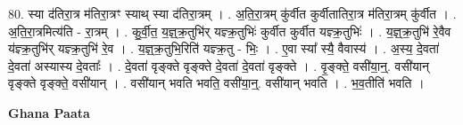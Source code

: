 \documentclass[17pt]{extarticle}
\begin{document}
80. स्या द॑तिरा॒त्र म॑तिरा॒त्रꣳ स्याथ् स्या द॑तिरा॒त्रम् । . अ॒ति॒रा॒त्रम् कु॑र्वीत कुर्वीतातिरा॒त्र म॑तिरा॒त्रम् कु॑र्वीत । . अ॒ति॒रा॒त्रमित्य॑ति - रा॒त्रम् । . कु॒र्वी॒त॒ य॒ज्ञ्॒क्र॒तुभि॑र् यज्ञ्क्र॒तुभिः॑ कुर्वीत कुर्वीत यज्ञ्क्र॒तुभिः॑ । . य॒ज्ञ्॒क्र॒तुभि॑ रे॒वैव य॑ज्ञ्क्र॒तुभि॑र् यज्ञ्क्र॒तुभि॑ रे॒व । . य॒ज्ञ्॒क्र॒तुभि॒रिति॑ यज्ञ्क्र॒तु - भिः॒ । . ए॒वा स्या᳚ स्यै॒ वैवास्य॑ । . अ॒स्य॒ दे॒वता॑ दे॒वता॑ अस्यास्य दे॒वताः᳚ । . दे॒वता॑ वृङ्क्ते वृङ्क्ते दे॒वता॑ दे॒वता॑ वृङ्क्ते । . वृ॒ङ्क्ते॒ वसी॑या॒न्॒. वसी॑यान् वृङ्क्ते वृङ्क्ते॒ वसी॑यान् । . वसी॑यान् भवति भवति॒ वसी॑या॒न्॒. वसी॑यान् भवति । . भ॒व॒तीति॑ भवति । \newline

\textbf{Ghana Paata } \newline
\end{document}
